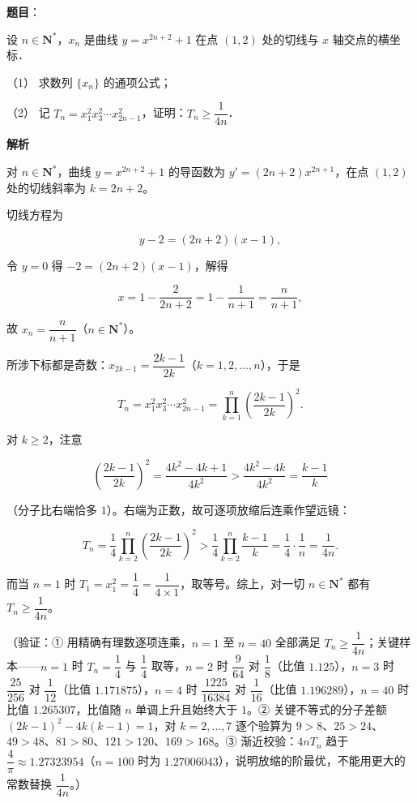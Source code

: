 \begin{answer}

\textbf{题目}：

设 \(n\in\mathbf{N}^{*}\)，\(x_n\) 是曲线 \(y=x^{2n+2}+1\) 在点 \((1,2)\) 处的切线与 \(x\) 轴交点的横坐标．

（1） 求数列 \(\{x_n\}\) 的通项公式；

（2） 记 \(T_n=x_1^2x_3^2\cdots x_{2n-1}^2\)，证明：\(T_n\geqslant\dfrac{1}{4n}\)．

\textbf{解析}

对 \(n\in\mathbf{N}^{*}\)，曲线 \(y=x^{2n+2}+1\) 的导函数为 \(y'=(2n+2)x^{2n+1}\)，在点 \((1,2)\) 处的切线斜率为 \(k=2n+2\)。


切线方程为

\nopagebreak[4]
\[
y-2=(2n+2)(x-1),
\]

令 \(y=0\) 得 \(-2=(2n+2)(x-1)\)，解得

\nopagebreak[4]
\[
x=1-\dfrac{2}{2n+2}=1-\dfrac{1}{n+1}=\dfrac{n}{n+1},
\]

故 \(x_n=\dfrac{n}{n+1}\)（\(n\in\mathbf{N}^{*}\)）。


所涉下标都是奇数：\(x_{2k-1}=\dfrac{2k-1}{2k}\)（\(k=1,2,\dots,n\)），于是

\nopagebreak[4]
\[
T_n=x_1^2x_3^2\cdots x_{2n-1}^2=\prod_{k=1}^{n}\left(\dfrac{2k-1}{2k}\right)^2 .
\]

对 \(k\geqslant 2\)，注意

\nopagebreak[4]
\[
\left(\dfrac{2k-1}{2k}\right)^2=\dfrac{4k^2-4k+1}{4k^2}>\dfrac{4k^2-4k}{4k^2}=\dfrac{k-1}{k}
\]

（分子比右端恰多 \(1\)）。右端为正数，故可逐项放缩后连乘作望远镜：

\nopagebreak[4]
\[
T_n=\dfrac{1}{4}\prod_{k=2}^{n}\left(\dfrac{2k-1}{2k}\right)^2>\dfrac{1}{4}\prod_{k=2}^{n}\dfrac{k-1}{k}=\dfrac{1}{4}\cdot\dfrac{1}{n}=\dfrac{1}{4n}.
\]

而当 \(n=1\) 时 \(T_1=x_1^2=\dfrac{1}{4}=\dfrac{1}{4\times 1}\)，取等号。综上，对一切 \(n\in\mathbf{N}^{*}\) 都有 \(T_n\geqslant\dfrac{1}{4n}\)。

（验证：① 用精确有理数逐项连乘，\(n=1\) 至 \(n=40\) 全部满足 \(T_n\geqslant\dfrac{1}{4n}\)；关键样本——\(n=1\) 时 \(T_n=\dfrac{1}{4}\) 与 \(\dfrac{1}{4}\) 取等，\(n=2\) 时 \(\dfrac{9}{64}\) 对 \(\dfrac{1}{8}\)（比值 \(1.125\)），\(n=3\) 时 \(\dfrac{25}{256}\) 对 \(\dfrac{1}{12}\)（比值 \(1.171875\)），\(n=4\) 时 \(\dfrac{1225}{16384}\) 对 \(\dfrac{1}{16}\)（比值 \(1.196289\)），\(n=40\) 时比值 \(1.265307\)，比值随 \(n\) 单调上升且始终大于 \(1\)。② 关键不等式的分子差额 \((2k-1)^2-4k(k-1)=1\)，对 \(k=2,\dots,7\) 逐个验算为 \(9>8\)、\(25>24\)、\(49>48\)、\(81>80\)、\(121>120\)、\(169>168\)。③ 渐近校验：\(4nT_n\) 趋于 \(\dfrac{4}{\pi}\approx 1.27323954\)（\(n=100\) 时为 \(1.27006043\)），说明放缩的阶最优，不能用更大的常数替换 \(\dfrac{1}{4n}\)。）


\end{answer}
